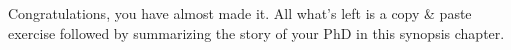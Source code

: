 
Congratulations, you have almost made it.
All what's left is a copy \& paste exercise followed by summarizing the story of your PhD in this synopsis chapter.



